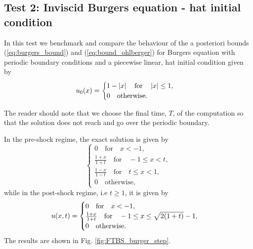 \documentclass[final]{amsart}
\numberwithin{equation}{section}
\begin{document}
\subsection{Test 2: Inviscid Burgers equation - hat initial condition }\label{test:burger_hat} In this test we benchmark and compare the behaviour of the a posteriori bounds (\ref{eq:burgers_bound}) and (\ref{eq:bound_ohlberger}) for Burgers equation with periodic boundary conditions and  a piecewise linear, hat initial condition given by
\begin{equation}\label{eq:burger_pwlin_ic}
u_0\!\left({x}\right) = 
\begin{cases}
1-\left|x\right|\quad \text{for}\quad \left|x\right|\leq 1,\\
0\quad\text{otherwise}.
\end{cases}
\end{equation}


\begin{Rem} The reader should note that we choose the final time, $T$, of the computation so that the solution does not reach and go over the periodic boundary.
\end{Rem}




 In the pre-shock regime, the exact solution is given by 
\begin{equation}\label{eq:burger_pwlin_preshock_exact}
\begin{cases}
0\quad \text{for}\quad x<-1,\\
\frac{1+x}{1+t}\quad\text{for}\quad -1\leq x<t,\\
\frac{1-x}{1-t}\quad\text{for}\quad t\leq x<1,\\
0\quad\text{otherwise},
\end{cases}
\end{equation}
while in the post-shock regime, i.e $t\geq 1$, it is given by 
\begin{equation}\label{eq:burger_pwlin_postshock_exact}
u\!\left({x,t}\right)
=
\begin{cases}
0\quad\text{for}\quad x<-1,\\
\frac{1+x}{1+t}\quad\text{for}\quad -1\leq x\leq\sqrt{2\!\left({1+t}\right)}-1,\\
0\quad\text{otherwise}.
\end{cases}
\end{equation}
The results are shown in Fig. \ref{fig:FTBS_burger_step}.  
\end{document}
